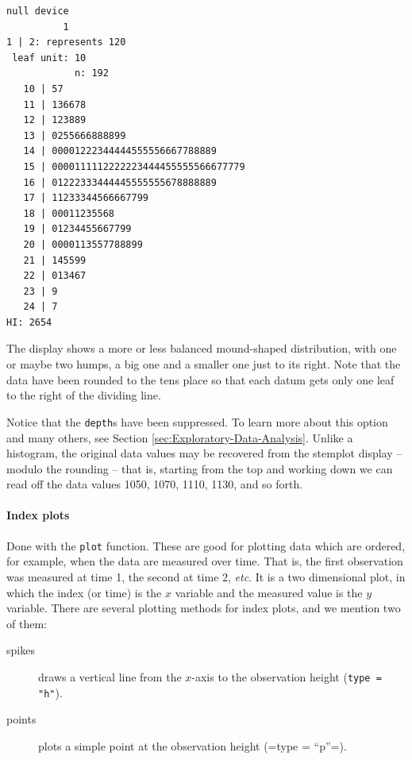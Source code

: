 \documentclass[captions=tableheading]{scrbook}
\begin{document}
\begin{verbatim}
null device 
          1
1 | 2: represents 120
 leaf unit: 10
            n: 192
   10 | 57
   11 | 136678
   12 | 123889
   13 | 0255666888899
   14 | 00001222344444555556667788889
   15 | 0000111112222223444455555566677779
   16 | 01222333444445555555678888889
   17 | 11233344566667799
   18 | 00011235568
   19 | 01234455667799
   20 | 0000113557788899
   21 | 145599
   22 | 013467
   23 | 9
   24 | 7
HI: 2654
\end{verbatim}

The display shows a more or less balanced mound-shaped distribution, with one or maybe two humps, a big one and a smaller one just to its right. Note that the data have been rounded to the tens place so that each datum gets only one leaf to the right of the dividing line.

Notice that the \texttt{depth}s have been suppressed. To learn more about this option and many others, see Section \ref{sec:Exploratory-Data-Analysis}. Unlike a histogram, the original data values may be recovered from the stemplot display -- modulo the rounding -- that is, starting from the top and working down we can read off the data values 1050, 1070, 1110, 1130, and so forth. 

\paragraph*{Index plots}

Done with the \texttt{plot} function. These are good for plotting data which are ordered, for example, when the data are measured over time. That is, the first observation was measured at time 1, the second at time 2, \emph{etc}. It is a two dimensional plot, in which the index (or time) is the \(x\) variable and the measured value is the \(y\) variable. There are several plotting methods for index plots, and we mention two of them:

\begin{description}
\item[spikes] draws a vertical line from the \(x\)-axis to the observation height (\texttt{type = "h"}).
\item[points] plots a simple point at the observation height (=type = ``p''=).
\end{description}
\end{document}

